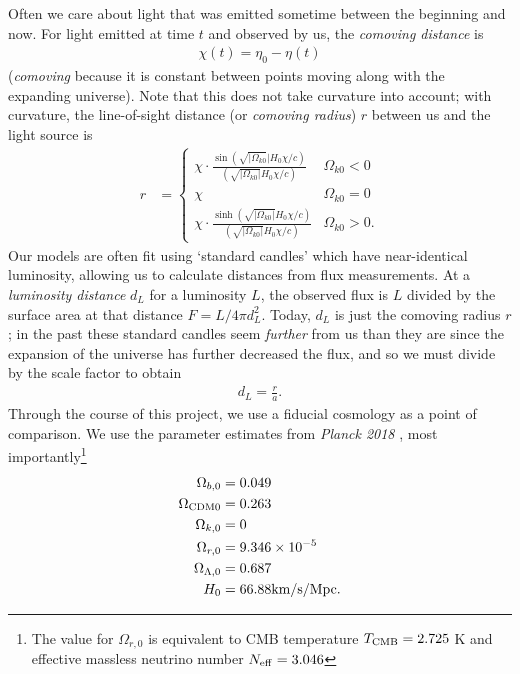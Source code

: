 \documentclass[aps,prl,twocolumn,groupedaddress,nofootinbib]{revtex4-2}
\newcommand{\Obo}{\Omega_{b,0}}
\newcommand{\Oro}{\Omega_{r,0}}
\newcommand{\Oko}{\Omega_{k,0}}
\newcommand{\Olo}{\Omega_{\Lambda,0}}
\begin{document}
Often we care about light that was emitted sometime between the beginning and now. For light emitted at time $t$ and observed by us, the \textit{comoving distance} is
\begin{align*}
    \chi(t) = \eta_0 - \eta(t)
\end{align*}
(\textit{comoving} because it is constant between points moving along with the expanding universe). Note that this does not take curvature into account; with curvature, the line-of-sight distance (or \textit{comoving radius}) $r$ between us and the light source is
\begin{align*}
    r & = \begin{cases}
              \chi \cdot \frac{\sin \left( \sqrt{|\Omega_{k 0}}| H_0 \chi /c \right)}{\left(\sqrt{|\Omega_{k 0}|}H_0\chi / c\right)}
               & \Omega_{k 0} < 0  \\
              \chi
               & \Omega_{k 0} =0   \\
              \chi \cdot \frac{\sinh \left( \sqrt{|\Omega_{k 0}|} H_0 \chi / c\right)}{\left(\sqrt{|\Omega_{k 0}|}H_0\chi / c\right) }
               & \Omega_{k 0} > 0.
          \end{cases}
\end{align*}
Our models are often fit using `standard candles' which have near-identical luminosity, allowing us to calculate distances from flux measurements. At a \textit{luminosity distance} $d_L$ for a luminosity $L$, the observed flux is $L$ divided by the surface area at that distance $F=L/4\pi d_L^2$. Today, $d_L$ is just the comoving radius $r$; in the past these standard candles seem \textit{further} from us than they are since the expansion of the universe has further decreased the flux, and so we must divide by the scale factor to obtain
\begin{align}
    \label{eq:dL}
    d_L = \frac{r}{a}.
\end{align}
Through the course of this project, we use a fiducial cosmology as a point of comparison. We use the parameter estimates from \textit{Planck 2018} \cite{aghanim_planck_2020}, most importantly\footnote{The value for $\Oro$ is equivalent to CMB temperature $T_{\rm CMB}=2.725$ K and effective massless neutrino number $N_{\rm eff}=3.046$}
\begin{align*}
    \Obo               & = 0.049                 \\
    \Omega_{\rm{CDM}0} & = 0.263                 \\
    \Oko               & = 0                     \\
    \Oro               & = 9.346\times 10^{-5}   \\
    \Olo               & = 0.687                 \\
    H_0                & = 66.88 {\rm km/s/Mpc}.
\end{align*}
\end{document}
